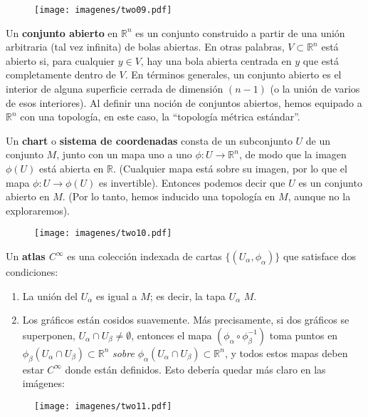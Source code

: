 \documentclass[11pt,b5paper,openany,twoside]{book}
\begin{document}
\begin{figure}[h]
\centering
\texttt{[image: imagenes/two09.pdf]}
\end{figure}

\noindent
Un {\bf conjunto abierto} en $\mathbb{R}^n$ es un conjunto construido a partir de una unión arbitraria (tal vez infinita) de bolas abiertas.
En otras palabras, $V\subset \mathbb{R}^n$ está abierto si, para cualquier $y\in V$, hay una bola abierta centrada en $y$ que está completamente dentro de $V$.
En términos generales, un conjunto abierto es el interior de alguna superficie cerrada de dimensión $(n-1)$ (o la unión de varios de esos interiores).
Al definir una noción de conjuntos abiertos, hemos equipado a $\mathbb{R}^n$ con una topología, en este caso, la ``topología métrica estándar''.

Un {\bf chart} o {\bf sistema de coordenadas} consta de un subconjunto $U$ de un conjunto $M$, junto con un mapa uno a uno $\phi:U\rightarrow\mathbb{R}^n$, de modo que la imagen $\phi(U)$ está abierta en $\mathbb{R}$.
(Cualquier mapa está sobre su imagen, por lo que el mapa $\phi:U\rightarrow \phi(U)$ es invertible).
Entonces podemos decir que $U$ es un conjunto abierto en $M$.
(Por lo tanto, hemos inducido una topología en $M$, aunque no la exploraremos).

\begin{figure}[h]
\centering
\texttt{[image: imagenes/two10.pdf]}
\end{figure}

\noindent
Un {\bf atlas $C^\infty$} es una colección indexada de cartas $\{(U_\alpha,\phi_\alpha)\}$ que satisface dos condiciones:

\begin{enumerate}
\item La unión del $U_\alpha$ es igual a $M$; es decir, la tapa $U_\alpha$ $M$.
\item Los gráficos están cosidos suavemente.
Más precisamente, si dos gráficos se superponen, $U_\alpha\cap U_\beta\neq\emptyset$, entonces el mapa $(\phi_\alpha\circ\phi_\beta^{-1})$ toma puntos en $\phi_\beta(U_\alpha\cap U_\beta)\subset\mathbb{R}^n$ {\it sobre} $\phi_\alpha(U_\alpha\cap U_\beta)\subset\mathbb{R}^n$, y todos estos mapas deben estar $C^\infty$ donde están definidos.
Esto debería quedar más claro en las imágenes:

\end{enumerate}

\begin{figure}[h]
\centering
\texttt{[image: imagenes/two11.pdf]}
\end{figure}
\end{document}
